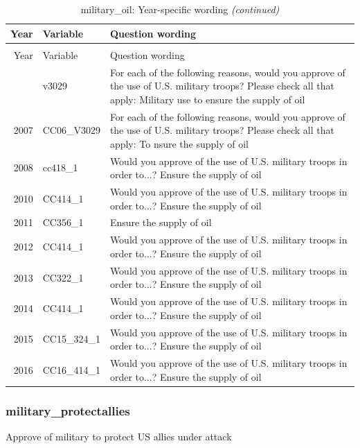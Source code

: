 \documentclass[12pt]{article}
\begin{document}
\begin{longtable}[t]{rl>{\raggedright\arraybackslash}p{10cm}}
\caption{\label{tab:unnamed-chunk-4}military\_oil: Year-specific wording}\\
\toprule
Year & Variable & Question wording\\
\midrule
\endfirsthead
\caption[]{military\_oil: Year-specific wording \textit{(continued)}}\\
\toprule
Year & Variable & Question wording\\
\midrule
\endhead
\
\endfoot
\bottomrule
\endlastfoot
2006 & v3029 & For each of the following reasons, would you approve of the use of U.S. military troops? Please check all that apply: Military use to ensure the supply of oil\\
2007 & CC06\_V3029 & For each of the following reasons, would you approve of the use of U.S. military troops? Please check all that apply: To nsure the supply of oil\\
2008 & cc418\_1 & Would you approve of the use of U.S. military troops in order to...? Ensure the supply of oil\\
2010 & CC414\_1 & Would you approve of the use of U.S. military troops in order to...? Ensure the supply of oil\\
2011 & CC356\_1 & Ensure the supply of oil\\
2012 & CC414\_1 & Would you approve of the use of U.S. military troops in order to...? Ensure the supply of oil\\
2013 & CC322\_1 & Would you approve of the use of U.S. military troops in order to...? Ensure the supply of oil\\
2014 & CC414\_1 & Would you approve of the use of U.S. military troops in order to...? Ensure the supply of oil\\
2015 & CC15\_324\_1 & Would you approve of the use of U.S. military troops in order to...? Ensure the supply of oil\\
2016 & CC16\_414\_1 & Would you approve of the use of U.S. military troops in order to...? Ensure the supply of oil\\*
\end{longtable}

\subsubsection{military\_protectallies}\label{military_protectallies}

Approve of military to protect US allies under attack
\end{document}
